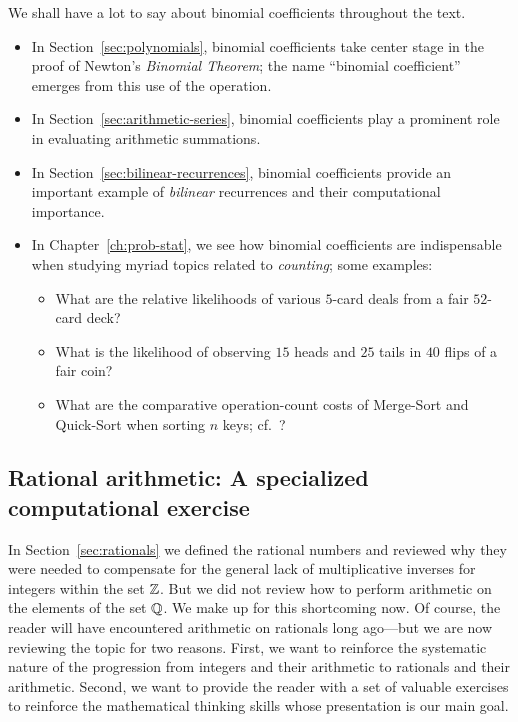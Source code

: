 We shall have a lot to say about binomial coefficients throughout the
text.
\begin{itemize}
\item
In Section~\ref{sec:polynomials}, binomial coefficients take center
stage in the proof of Newton's {\it Binomial Theorem}; the name
``binomial coefficient'' emerges from this use of the operation.
\item
In Section~\ref{sec:arithmetic-series}, binomial coefficients play a
prominent role in evaluating arithmetic summations.
\item
In Section~\ref{sec:bilinear-recurrences}, binomial coefficients
provide an important example of {\em bilinear} recurrences and their
computational importance.
\item
In Chapter~\ref{ch:prob-stat}, we see how binomial coefficients are
indispensable when studying myriad topics related to {\em counting};
some examples:
  \begin{itemize}
  \item
What are the relative likelihoods of various $5$-card deals from a
fair $52$-card deck?
  \item
What is the likelihood of observing $15$ {\sc head}s and $25$ {\sc
  tail}s in $40$ flips of a fair coin?
  \item
What are the comparative operation-count costs of Merge-Sort and
Quick-Sort when sorting $n$ keys; cf.~\cite{CLRS}?
  \end{itemize}
\end{itemize}


\subsection{Rational arithmetic: A specialized computational exercise}
\label{sec:Rational-arithmetic}

In Section~\ref{sec:rationals} we defined the rational numbers and
reviewed why they were needed to compensate for the general lack of
multiplicative inverses for integers within the set $\mathbb{Z}$.  But we did
not review how to perform arithmetic on the elements of the set $\mathbb{Q}$.
We make up for this shortcoming now.  Of course, the reader will have
encountered arithmetic on rationals long ago---but we are now
reviewing the topic for two reasons.  First, we want to reinforce the
systematic nature of the progression from integers and their
arithmetic to rationals and their arithmetic.  Second, we want to
provide the reader with a set of valuable exercises to reinforce the
mathematical thinking skills whose presentation is our main goal.

